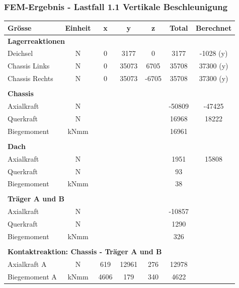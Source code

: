   \subsubsection{FEM-Ergebnis - Lastfall 1.1 Vertikale Beschleunigung}
  \begin{table}[H]
    \centering
    \begin{threeparttable}
      \begin{tabular}{lcccccc}
        Grösse	&	Einheit	&	x	&	y	&	z	&	Total	&	Berechnet	\\	\hline
        \multicolumn{5}{l}{\textbf{Lagerreaktionen}}									&		&		\\	\thickhline
        Deichsel	&	N	&	0	&	3177	&	0	&	3177	&	-1028 (y)	\\
        Chassis Links	&	N	&	0	&	35073	&	6705	&	35708	&	37300 (y)	\\
        Chassis Rechts	&	N	&	0	&	35073	&	-6705	&	35708	&	37300 (y)	\\	\hline	\\
        \multicolumn{5}{l}{\textbf{Chassis}}									&		&		\\	\thickhline
        Axialkraft	&	N	&		&		&		&	-50809	&	-47425	\\
        Querkraft	&	N	&		&		&		&	16968	&	18222\tnote{4} \\
        Biegemoment	&	kNmm	&		&		&		&	16961	&		\\	\hline	\\
        \multicolumn{5}{l}{\textbf{Dach}}									&		&		\\	\thickhline
        Axialkraft	&	N	&		&		&		&	1951	&	15808	\\
        Querkraft	&	N	&		&		&		&	93	&		\\
        Biegemoment	&	kNmm	&		&		&		&	38	&		\\	\hline	\\
        \multicolumn{5}{l}{\textbf{Träger A und B}}													\\	\thickhline
        Axialkraft	&	N	&		&		&		&	-10857	&		\\
        Querkraft	&	N	&		&		&		&	1290	&		\\
        Biegemoment	&	kNmm	&		&		&		&	326	&		\\	\hline	\\
        \multicolumn{5}{l}{\textbf{Kontaktreaktion: Chassis - Träger A und B}}									&		&		\\	\thickhline
        Axialkraft A	&	N	&	619	&	12961	&	276	&	12978	&		\\
        Biegemoment A	&	kNmm	&	4606	&	179	&	340	&	4622	&		\\

\end{tabular}
\end{threeparttable}
\end{table}
